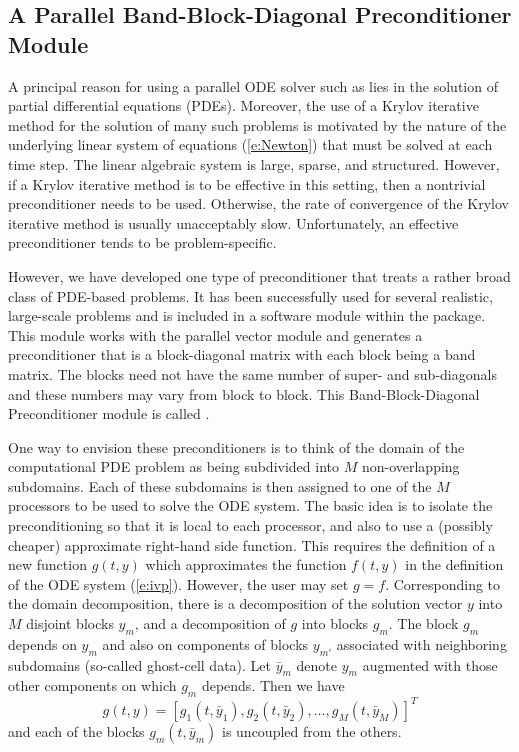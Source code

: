
\subsection{A Parallel Band-Block-Diagonal Preconditioner Module}\label{sss:cvbbdpre}

A principal reason for using a parallel ODE solver such as {\cvodes} lies
in the solution of partial differential equations (PDEs).  Moreover,
the use of a Krylov iterative method for the solution of many such
problems is motivated by the nature of the underlying linear system of
equations (\ref{e:Newton}) that must be solved at each time step.  The
linear algebraic system is large, sparse, and structured. However, if
a Krylov iterative method is to be effective in this setting, then a
nontrivial preconditioner needs to be used.  Otherwise, the rate of
convergence of the Krylov iterative method is usually unacceptably
slow.  Unfortunately, an effective preconditioner tends to be
problem-specific.

However, we have developed one type of preconditioner that treats a
rather broad class of PDE-based problems.  It has been successfully
used for several realistic, large-scale problems \cite{HiTa:98} and is
included in a software module within the {\cvodes} package. This module
works with the parallel vector module {\nvecp} and 
generates a preconditioner that is a block-diagonal matrix with each
block being a band matrix. The blocks need not have the same number of
super- and sub-diagonals and these numbers may vary from block to
block. This Band-Block-Diagonal Preconditioner module is called
{\cvbbdpre}.

One way to envision these preconditioners is to think of the domain of
the computational PDE problem as being subdivided into $M$ non-overlapping
subdomains.  Each of these subdomains is then assigned to one of the
$M$ processors to be used to solve the ODE system. The basic idea is
to isolate the preconditioning so that it is local to each processor,
and also to use a (possibly cheaper) approximate right-hand side
function. This requires the definition of a new function $g(t,y)$
which approximates the function $f(t, y)$ in the definition of the ODE
system (\ref{e:ivp}). However, the user may set $g = f$.  Corresponding
to the domain decomposition, there is a decomposition of the solution
vector $y$ into $M$ disjoint blocks $y_m$, and a decomposition of $g$
into blocks $g_m$.  The block $g_m$ depends on $y_m$ and also on
components of blocks $y_{m'}$ associated with neighboring subdomains
(so-called ghost-cell data).  Let $\bar{y}_m$ denote $y_m$ augmented
with those other components on which $g_m$ depends.  Then we have
\begin{equation}
g(t,y) = [g_1(t,\bar{y}_1), g_2(t,\bar{y}_2), \ldots, g_M(t,\bar{y}_M)]^T
\end{equation}
and each of the blocks $g_m(t, \bar{y}_m)$ is uncoupled from the others.


